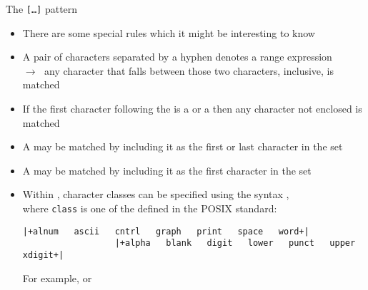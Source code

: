 \begin{frame}[fragile]{The \texttt{[\ldots]} pattern}
    \vspace{-3mm}
    \begin{itemize}
        \item There are some special rules which it might be interesting to know
        \item A pair of characters separated by a hyphen denotes a range expression\\
              $\to\;$ any character that falls between those two characters, inclusive, is matched
        \item If the first character following the \PB{\texttt{[}} is a \PP{\texttt{!}} or a \PP{\texttt{\^{}}} then any character not enclosed is matched
        \item A \PP{\texttt{-}} may be matched by including it as the first or last character in the set
        \item A \PP{\texttt{]}} may be matched by including it as the first character in the set
        \item Within \PB{\texttt{[\ldots]}}, character classes can be specified using the syntax \PB{\texttt{[:class:]}},\\
              where \texttt{class} is one of the  defined in the POSIX standard:
              \begin{lstlisting}[style=MyBash, numbers=none, xleftmargin=2mm, xrightmargin=15mm, aboveskip=3mm, belowskip=-5mm]
                  |+alnum   ascii   cntrl   graph   print   space   word+|
                  |+alpha   blank   digit   lower   punct   upper   xdigit+|
              \end{lstlisting}
              For example, \PB{\texttt{[[:digit:]]}} or \PB{\texttt{[[:blank:]]}}
    \end{itemize}
\end{frame}
